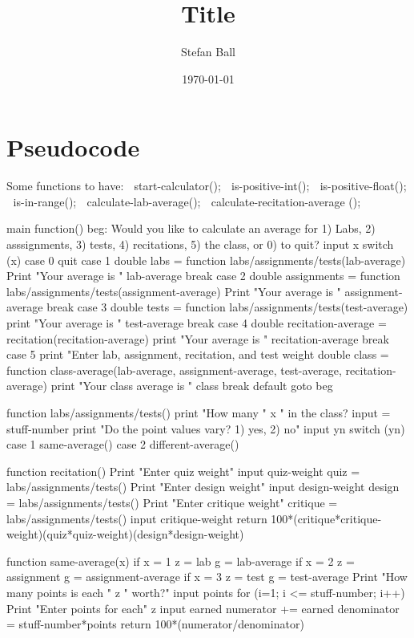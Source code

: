 \documentclass{article}
\title{Title}
\author{Stefan Ball}
\date{\today}
\begin{document}
\maketitle

\section*{Pseudocode}

Some functions to have:
 start-calculator();
 is-positive-int();
 is-positive-float();
 is-in-range();
 calculate-lab-average();
 calculate-recitation-average ();


main function()
beg:
   Would you like to calculate an average for 1) Labs, 2) asssignments, 3) tests, 4) recitations, 5) the class, or 0) to quit?
   input x
      switch (x)
         case 0
            quit
         case 1
            double labs = function labs/assignments/tests(lab-average)
            Print "Your average is " lab-average
            break
	 case 2
	    double assignments = function labs/assignments/tests(assignment-average)
	    Print "Your average is " assignment-average
	    break
	 case 3
	    double tests = function labs/assignments/tests(test-average)
	    print "Your average is " test-average
	    break
	 case 4
	    double recitation-average = recitation(recitation-average)
	    print "Your average is " recitation-average
	    break
         case 5
	    print "Enter lab, assignment, recitation, and test weight
            double class = function class-average(lab-average, assignment-average, test-average, recitation-average)
            print "Your class average is " class
            break
         default
            goto beg


function labs/assignments/tests()
   print "How many " x " in the class?
   input = stuff-number
   print "Do the point values vary? 1) yes, 2) no"
   input yn
   switch (yn)
      case 1
         same-average()
      case 2
         different-average()	     

function recitation()
   Print "Enter quiz weight"
   input quiz-weight
   quiz = labs/assignments/tests()
   Print "Enter design weight"
   input design-weight
   design = labs/assignments/tests()
   Print "Enter critique weight"
   critique = labs/assignments/tests()
   input critique-weight
   return 100*(critique*critique-weight)(quiz*quiz-weight)(design*design-weight)


function same-average(x)
   if x = 1
      z = lab
      g = lab-average
   if x = 2
      z = assignment
      g = assignment-average
   if x = 3
      z = test
      g = test-average
   Print "How many points is each " z " worth?"
   input points
   for (i=1; i <= stuff-number; i++)
      Print "Enter points for each" z 
      input earned
      numerator += earned
   denominator = stuff-number*points
   return 100*(numerator/denominator)
\end{document}

